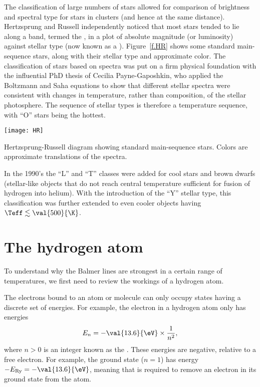 The classification of large numbers of stars allowed for comparison of brightness and spectral type for stars in clusters (and hence at the same distance).
Hertzsprung and Russell independently noticed\cite{Hertzsprung1909Uber-die-Sterne,Russell1914Relations-Betwe} that most stars tended to lie along a band, termed the , in a plot of absolute magnitude (or luminosity) against stellar type (now known as a ). Figure~\ref{f.HR} shows some standard main-sequence stars, along with their stellar type and approximate color. The classification of stars based on spectra was put on a firm physical foundation with the influential PhD thesis of Cecilia Payne-Gaposhkin\cite{Payne1925Stellar-Atmosph}, who applied the Boltzmann and Saha equations to show that different stellar spectra were consistent with changes in temperature, rather than composition, of the stellar photosphere. The sequence of stellar types is therefore a temperature sequence, with ``O'' stars being the hottest. 
\begin{marginfigure}
\texttt{[image: HR]}
\caption[Hertzsprung-Russell diagram of standard main-sequence stars]{\label{f.HR} Hertzsprung-Russell diagram showing standard main-sequence stars. Colors are approximate translations of the spectra.}
\end{marginfigure}

In the 1990's the ``L'' and ``T'' classes were added\cite{Kirkpatrick1999Dwarfs-Cooler-t} for cool stars and brown dwarfs (stellar-like objects that do not reach central temperature sufficient for fusion of hydrogen into helium). With the introduction of the ``Y'' stellar type\cite{Cushing2011The-Discovery-o}, this classification was further extended to even cooler objects having $\Teff\lesssim\val{500}{\K}$.

\section{The hydrogen atom}

To understand why the Balmer lines are strongest in a certain range of temperatures, we first need to review the workings of a hydrogen atom.

The electrons bound to an atom or molecule can only occupy states having a discrete set of energies. For example, the electron in a hydrogen atom only has energies
\begin{equation}\label{e.H-levels}
        E_{n} = -\val{13.6}{\eV}\times \frac{1}{n^{2}},
\end{equation}
where $n > 0$ is an integer known as the .  These energies are negative, relative to a free electron.  For example, the ground state ($n=1$) has energy $-\ERy = -\val{13.6}{\eV}$, meaning that  is required to remove an electron in its ground state from the atom.

